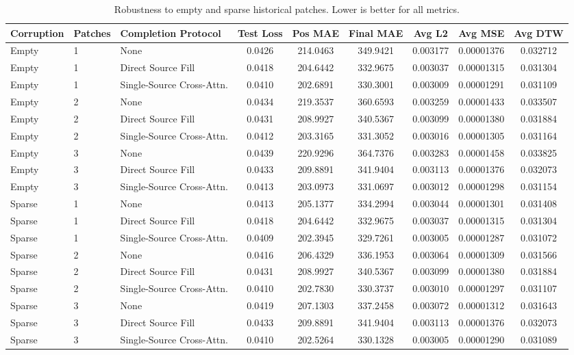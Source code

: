 \begin{table}[t]
    \centering
    \caption{Robustness to empty and sparse historical patches. Lower is better for all metrics.}
    \label{tab:missing-sparse-robustness}
    \small
    \begin{tabularx}{\textwidth}{llXcccccc}
        \hline
        Corruption & Patches & Completion Protocol & Test Loss & Pos MAE & Final MAE & Avg L2 & Avg MSE & Avg DTW \\
        \hline
        Empty & 1 & None & 0.0426 & 214.0463 & 349.9421 & 0.003177 & 0.00001376 & 0.032712 \\
        Empty & 1 & Direct Source Fill & 0.0418 & 204.6442 & 332.9675 & 0.003037 & 0.00001315 & 0.031304 \\
        Empty & 1 & Single-Source Cross-Attn. & 0.0410 & 202.6891 & 330.3001 & 0.003009 & 0.00001291 & 0.031109 \\
        \hline
        Empty & 2 & None & 0.0434 & 219.3537 & 360.6593 & 0.003259 & 0.00001433 & 0.033507 \\
        Empty & 2 & Direct Source Fill & 0.0431 & 208.9927 & 340.5367 & 0.003099 & 0.00001380 & 0.031884 \\
        Empty & 2 & Single-Source Cross-Attn. & 0.0412 & 203.3165 & 331.3052 & 0.003016 & 0.00001305 & 0.031164 \\
        \hline
        Empty & 3 & None & 0.0439 & 220.9296 & 364.7376 & 0.003283 & 0.00001458 & 0.033825 \\
        Empty & 3 & Direct Source Fill & 0.0433 & 209.8891 & 341.9404 & 0.003113 & 0.00001376 & 0.032073 \\
        Empty & 3 & Single-Source Cross-Attn. & 0.0413 & 203.0973 & 331.0697 & 0.003012 & 0.00001298 & 0.031154 \\
        \hline
        Sparse & 1 & None & 0.0413 & 205.1377 & 334.2994 & 0.003044 & 0.00001301 & 0.031408 \\
        Sparse & 1 & Direct Source Fill & 0.0418 & 204.6442 & 332.9675 & 0.003037 & 0.00001315 & 0.031304 \\
        Sparse & 1 & Single-Source Cross-Attn. & 0.0409 & 202.3945 & 329.7261 & 0.003005 & 0.00001287 & 0.031072 \\
        \hline
        Sparse & 2 & None & 0.0416 & 206.4329 & 336.1953 & 0.003064 & 0.00001309 & 0.031566 \\
        Sparse & 2 & Direct Source Fill & 0.0431 & 208.9927 & 340.5367 & 0.003099 & 0.00001380 & 0.031884 \\
        Sparse & 2 & Single-Source Cross-Attn. & 0.0410 & 202.7830 & 330.3737 & 0.003010 & 0.00001297 & 0.031107 \\
        \hline
        Sparse & 3 & None & 0.0419 & 207.1303 & 337.2458 & 0.003072 & 0.00001312 & 0.031643 \\
        Sparse & 3 & Direct Source Fill & 0.0433 & 209.8891 & 341.9404 & 0.003113 & 0.00001376 & 0.032073 \\
        Sparse & 3 & Single-Source Cross-Attn. & 0.0410 & 202.5264 & 330.1328 & 0.003005 & 0.00001290 & 0.031089 \\
        \hline
    \end{tabularx}
\end{table}

